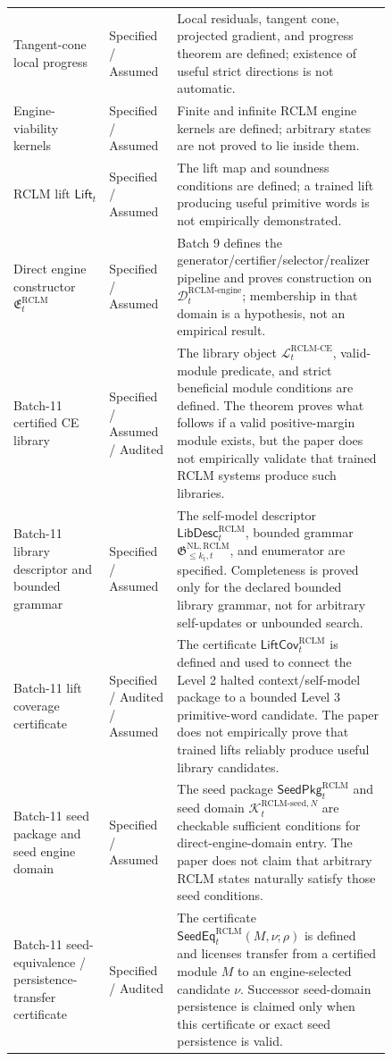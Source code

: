 \documentclass[11pt,a4paper]{article}
\newcommand{\Lcal}{\mathcal L}
\newcommand{\Kcal}{\mathcal K}
\newcommand{\Dcal}{\mathcal D}
\newcommand{\RCLM}{\mathrm{RCLM}}
\newcommand{\engine}{\mathrm{engine}}
\newcommand{\NL}{\mathrm{NL}}
\newcommand{\CE}{\mathrm{CE}}
\begin{document}
\begin{longtable}{p{0.24\linewidth}p{0.17\linewidth}p{0.43\linewidth}}
Tangent-cone local progress & Specified / Assumed & Local residuals, tangent cone, projected gradient, and progress theorem are defined; existence of useful strict directions is not automatic.\\
Engine-viability kernels & Specified / Assumed & Finite and infinite RCLM engine kernels are defined; arbitrary states are not proved to lie inside them.\\
RCLM lift \(\mathsf{Lift}_t\) & Specified / Assumed & The lift map and soundness conditions are defined; a trained lift producing useful primitive words is not empirically demonstrated.\\
Direct engine constructor \(\mathfrak E_t^{\RCLM}\) & Specified / Assumed & Batch 9 defines the generator/certifier/selector/realizer pipeline and proves construction on \(\Dcal_t^{\RCLM\text{-}\engine}\); membership in that domain is a hypothesis, not an empirical result.\\
Batch-11 certified CE library & Specified / Assumed / Audited & The library object \(\Lcal_t^{\RCLM\text{-}\CE}\), valid-module predicate, and strict beneficial module conditions are defined. The theorem proves what follows if a valid positive-margin module exists, but the paper does not empirically validate that trained RCLM systems produce such libraries.\\
Batch-11 library descriptor and bounded grammar & Specified / Assumed & The self-model descriptor \(\mathsf{LibDesc}_t^{\RCLM}\), bounded grammar \(\mathfrak G_{\le k_t,t}^{\NL,\RCLM}\), and enumerator are specified. Completeness is proved only for the declared bounded library grammar, not for arbitrary self-updates or unbounded search.\\
Batch-11 lift coverage certificate & Specified / Audited / Assumed & The certificate \(\mathsf{LiftCov}_t^{\RCLM}\) is defined and used to connect the Level 2 halted context/self-model package to a bounded Level 3 primitive-word candidate. The paper does not empirically prove that trained lifts reliably produce useful library candidates.\\
Batch-11 seed package and seed engine domain & Specified / Assumed & The seed package \(\mathsf{SeedPkg}_t^{\RCLM}\) and seed domain \(\Kcal_t^{\RCLM\text{-}\mathrm{seed},N}\) are checkable sufficient conditions for direct-engine-domain entry. The paper does not claim that arbitrary RCLM states naturally satisfy those seed conditions.\\
Batch-11 seed-equivalence / persistence-transfer certificate & Specified / Audited & The certificate \(\mathsf{SeedEq}_t^{\RCLM}(M,\nu;\rho)\) is defined and licenses transfer from a certified module \(M\) to an engine-selected candidate \(\nu\). Successor seed-domain persistence is claimed only when this certificate or exact seed persistence is valid.\\

\end{longtable}
\end{document}
